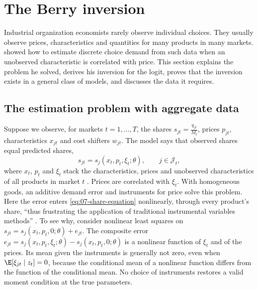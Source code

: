 \section{The Berry inversion}\label{sec:07-inversion}

Industrial organization economists rarely observe individual choices. They usually observe prices,
characteristics and quantities for many products in many markets. \citet{Berry1994} showed how to estimate
discrete choice demand from such data when an unobserved characteristic is correlated with price. This section
explains the problem he solved, derives his inversion for the logit, proves that the inversion exists in a
general class of models, and discusses the data it requires.

\subsection{The estimation problem with aggregate data}\label{sec:07-inversion-problem}

Suppose we observe, for markets $t = 1, \dots, T$, the shares $s_{jt} = \frac{q_{jt}}{M_t}$, prices $p_{jt}$,
characteristics $x_{jt}$ and cost shifters $w_{jt}$. The model says that observed shares equal predicted shares,
\begin{equation}\label{eq:07-share-equation}
  s_{jt} = s_j(x_t, p_t, \xi_t; \theta), \qquad j \in \mathcal{J}_t,
\end{equation}
where $x_t$, $p_t$ and $\xi_t$ stack the characteristics, prices and unobserved characteristics of all products
in market $t$ \citep[eq.~10]{Berry1994}. Prices are correlated with $\xi_t$. With homogeneous goods, an
additive demand error and instruments for price solve this problem. Here the error enters
\eqref{eq:07-share-equation} nonlinearly, through every product's share, ``thus frustrating the application of
traditional instrumental variables methods'' \citep[p.~248]{Berry1994}. To see why, consider nonlinear least
squares on $s_{jt} = s_j(x_t, p_t, 0; \theta) + e_{jt}$. The composite error $e_{jt} = s_j(x_t, p_t, \xi_t;
\theta) - s_j(x_t, p_t, 0; \theta)$ is a nonlinear function of $\xi_t$ and of the prices. Its mean given the
instruments is generally not zero, even when $\E[\xi_{jt} \mid z_t] = 0$, because the conditional mean of a
nonlinear function differs from the function of the conditional mean. No choice of instruments restores a valid
moment condition at the true parameters.

